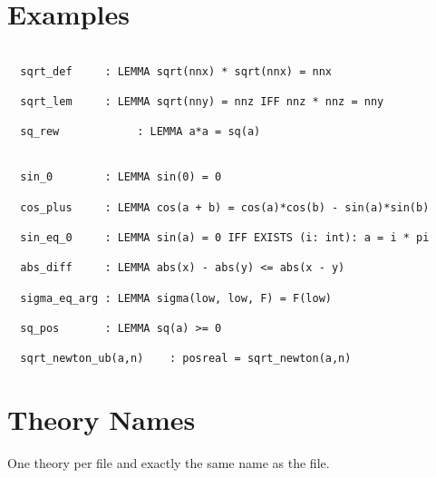 \documentclass[12pt]{article}
\begin{document}
\section{Examples}


\begin{verbatim}

  sqrt_def     : LEMMA sqrt(nnx) * sqrt(nnx) = nnx

  sqrt_lem     : LEMMA sqrt(nny) = nnz IFF nnz * nnz = nny

  sq_rew            : LEMMA a*a = sq(a) 

    
  sin_0        : LEMMA sin(0) = 0

  cos_plus     : LEMMA cos(a + b) = cos(a)*cos(b) - sin(a)*sin(b)

  sin_eq_0     : LEMMA sin(a) = 0 IFF EXISTS (i: int): a = i * pi
                     
  abs_diff     : LEMMA abs(x) - abs(y) <= abs(x - y)
      
  sigma_eq_arg : LEMMA sigma(low, low, F) = F(low)
      
  sq_pos       : LEMMA sq(a) >= 0

  sqrt_newton_ub(a,n)    : posreal = sqrt_newton(a,n)

\end{verbatim}

\section{Theory Names}

One theory per file and exactly the same name as the file.




%
\end{document}
